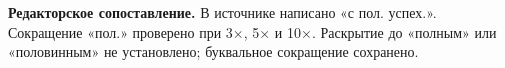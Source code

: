\par\smallskip\noindent\leavevmode{}\label{GELFAND-P001455:recolouring-success-abbreviation:editorial}{\footnotesize\textbf{Редакторское сопоставление.} В источнике написано «с пол. успех.». Сокращение «пол.» проверено при 3×, 5× и 10×. Раскрытие до «полным» или «половинным» не установлено; буквальное сокращение сохранено.\par}\smallskip
